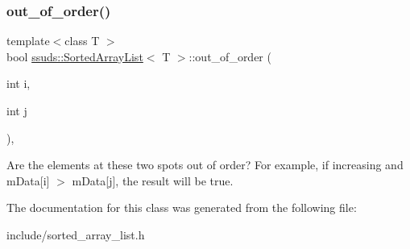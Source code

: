 \subsubsection{\texorpdfstring{out\_of\_order()}{out\_of\_order()}}
{\footnotesize\ttfamily template$<$class T $>$ \\
bool \mbox{\hyperlink{classssuds_1_1_sorted_array_list}{ssuds\+::\+Sorted\+Array\+List}}$<$ T $>$\+::out\+\_\+of\+\_\+order (\begin{DoxyParamCaption}\item[{int}]{i,  }\item[{int}]{j }\end{DoxyParamCaption})\hspace{0.3cm}{\ttfamily [inline]}, {\ttfamily [protected]}}

Are the elements at these two spots out of order? For example, if increasing and m\+Data\mbox{[}i\mbox{]} $>$ m\+Data\mbox{[}j\mbox{]}, the result will be true. 

The documentation for this class was generated from the following file\+:\begin{DoxyCompactItemize}
\item 
include/sorted\+\_\+array\+\_\+list.\+h\end{DoxyCompactItemize}
